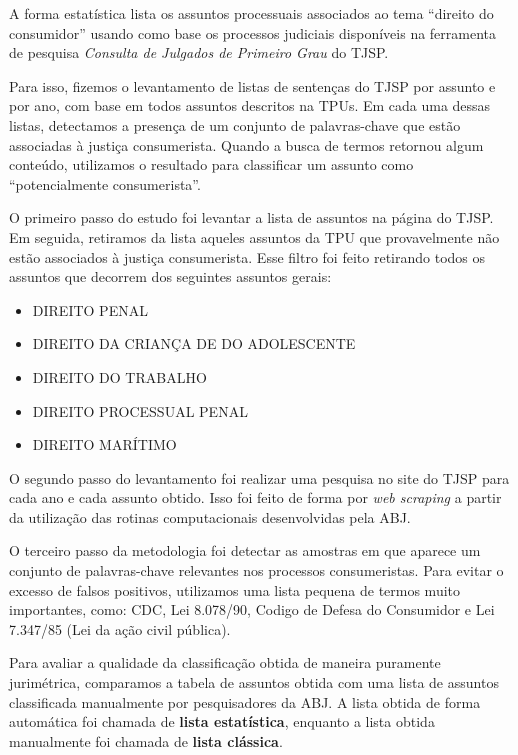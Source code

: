 \documentclass[]{report}
\providecommand{\tightlist}{%
  \setlength{\itemsep}{0pt}\setlength{\parskip}{0pt}}
\begin{document}
A forma estatística lista os assuntos processuais associados ao tema
``direito do consumidor'' usando como base os processos judiciais
disponíveis na ferramenta de pesquisa \emph{Consulta de Julgados de
Primeiro Grau} do TJSP.

Para isso, fizemos o levantamento de listas de sentenças do TJSP por
assunto e por ano, com base em todos assuntos descritos na TPUs. Em cada
uma dessas listas, detectamos a presença de um conjunto de
palavras-chave que estão associadas à justiça consumerista. Quando a
busca de termos retornou algum conteúdo, utilizamos o resultado para
classificar um assunto como ``potencialmente consumerista''.

O primeiro passo do estudo foi levantar a lista de assuntos na página do
TJSP. Em seguida, retiramos da lista aqueles assuntos da TPU que
provavelmente não estão associados à justiça consumerista. Esse filtro
foi feito retirando todos os assuntos que decorrem dos seguintes
assuntos gerais:

\begin{itemize}
\tightlist
\item
  DIREITO PENAL
\item
  DIREITO DA CRIANÇA DE DO ADOLESCENTE
\item
  DIREITO DO TRABALHO
\item
  DIREITO PROCESSUAL PENAL
\item
  DIREITO MARÍTIMO
\end{itemize}

O segundo passo do levantamento foi realizar uma pesquisa no site do
TJSP para cada ano e cada assunto obtido. Isso foi feito de forma por
\emph{web scraping} a partir da utilização das rotinas computacionais
desenvolvidas pela ABJ.

O terceiro passo da metodologia foi detectar as amostras em que aparece
um conjunto de palavras-chave relevantes nos processos consumeristas.
Para evitar o excesso de falsos positivos, utilizamos uma lista pequena
de termos muito importantes, como: CDC, Lei 8.078/90, Codigo de Defesa
do Consumidor e Lei 7.347/85 (Lei da ação civil pública).

Para avaliar a qualidade da classificação obtida de maneira puramente
jurimétrica, comparamos a tabela de assuntos obtida com uma lista de
assuntos classificada manualmente por pesquisadores da ABJ. A lista
obtida de forma automática foi chamada de \textbf{lista estatística},
enquanto a lista obtida manualmente foi chamada de \textbf{lista
clássica}.
\end{document}
